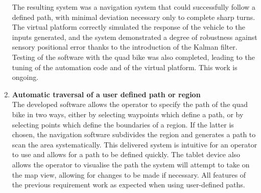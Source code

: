 \documentclass[main.tex]{subfiles}
\begin{document}
\begin{enumerate}
The resulting system was a navigation system that could successfully follow a defined path, with minimal deviation necessary only to complete sharp turns. The virtual platform correctly simulated the response of the vehicle to the inputs generated, and the system demonstrated a degree of robustness against sensory positional error thanks to the introduction of the Kalman filter. Testing of the software with the quad bike was also completed, leading to the tuning of the automation code and of the virtual platform. This work is ongoing.

\item \textbf{Automatic traversal of a user defined path or region}\\ 
The developed software allows the operator to specify the path of the quad bike in two ways, either by selecting waypoints which define a path, or by selecting points which define the boundaries of a region. If the latter is chosen, the navigation software subdivides the region and generates a path to scan the area systematically. 
This delivered system is intuitive for an operator to use and allows for a path to be defined quickly. The tablet device also allows the operator to visualise the path the system will attempt to take on the map view, allowing for changes to be made if necessary. All features of the previous requirement work as expected when using user-defined paths. 


\end{enumerate}
\end{document}
